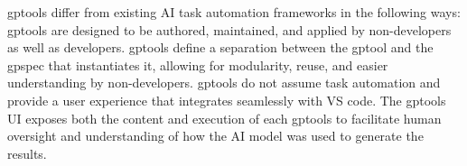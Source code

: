 gptools differ from existing AI task automation frameworks in the following ways: gptools are designed to be authored, maintained, and applied by non-developers as well as developers. gptools define a separation between the gptool and the gpspec that instantiates it, allowing for modularity, reuse, and easier understanding by non-developers. gptools do not assume task automation and provide a user experience that integrates seamlessly with VS code. The gptools UI exposes both the content and execution of each gptools to facilitate human oversight and understanding of how the AI model was used to generate the results.
    


    